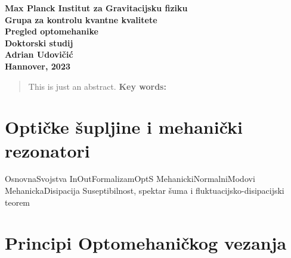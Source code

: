 \documentclass[10pt,leqno]{article}
\begin{document}
\begin{titlepage}
	\begin{center}
		{\LARGE \textbf{Max Planck Institut za Gravitacijsku fiziku}}\\[0.1cm]
		{\LARGE \textbf{Grupa za kontrolu kvantne kvalitete}}\\[1.5cm]
		{\Huge \textbf{Pregled optomehanike}}\\[1.0cm]
		{\Large \textbf{Doktorski studij}}\\[2.5cm]
		{\LARGE \textbf{Adrian Udovičić}}\\[14cm]
		\large\textbf{{Hannover, 2023} }
	\end{center}
\end{titlepage}

\newpage
{}
\begin{abstract}
	This is just an abstract.
	\vfill
	\textbf{Key words:}
\end{abstract}
\newpage
\tableofcontents
\hrulefill
\newpage

\part{Optičke šupljine i mehanički rezonatori}
{OsnovnaSvojstva}
\newpage
{InOutFormalizamOptS}
{MehanickiNormalniModovi}
{MehanickaDisipacija}
{Suseptibilnost, spektar šuma i fluktuacijsko-disipacijski teorem}

\newpage
\part{Principi Optomehaničkog vezanja}
\newpage


\listoftables
\listoffigures
\end{document}
